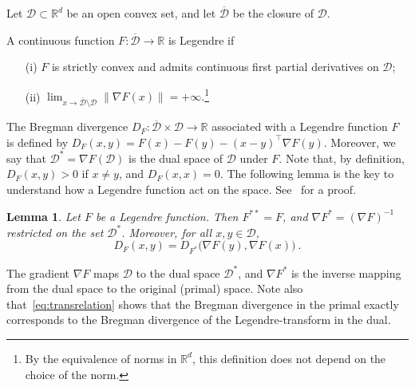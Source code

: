 \documentclass[11pt]{hackednow}
\newtheorem{lemma}{Lemma}[chapter]
\newcommand{\R}{\mathbb{R}}
\newcommand{\cD}{\mathcal{D}}
\newcommand{\oD}{\overline{\mathcal{D}}}
\newcommand{\norm}[1]{\left\|{#1}\right\|}
\begin{document}
Let $\cD \subset \R^d$ be an open convex set, and let $\oD$ be the closure of $\cD$. 
\begin{definition}
A continuous function $F:\oD\to\R$ is Legendre if 
\begin{itemize}
\item[(i)] $F$ is strictly convex and admits continuous first partial
derivatives on $\cD$;
\item[(ii)] ${\displaystyle \lim_{x \to \oD \setminus \cD} \norm{\nabla F(x)} = +\infty.}$\footnote{By the equivalence of norms in $\R^d$, this definition does not depend on the choice of the norm.}
\end{itemize}
\end{definition}
The Bregman divergence $D_F: \oD\times\cD \to \R$ associated with a Legendre function $F$ is defined by
  $
  D_F(x,y) = F(x) - F(y) - (x-y)^{\top} \nabla F(y)
  $. 
Moreover, we say that $\cD^* = \nabla F (\cD)$ is the dual space of $\cD$ under $F$.
Note that, by definition, $D_F(x,y) > 0$ if $x \neq y$, and $D_F(x,x)=0$. The following lemma is the key to understand how a Legendre function act on the space. See~\cite[Proposition~11.1]{CL06} for a proof.
\begin{lemma}
Let $F$ be a Legendre function. Then $F^{**} = F$, and $\nabla F^* = (\nabla F)^{-1}$ restricted on the set $\cD^*$. Moreover, for all $x, y \in \cD$,
\begin{equation} \label{eq:transrelation}
D_F(x,y) = D_{F^*}\bigl(\nabla F(y), \nabla F(x)\bigr)~.
\end{equation}
\end{lemma}
The gradient $\nabla F$ maps $\cD$ to the dual space $\cD^*$, and $\nabla F^*$ is the inverse mapping from the dual space to the original (primal) space. Note also that~\eqref{eq:transrelation} shows that the Bregman divergence in the primal exactly corresponds to the Bregman divergence of the Legendre-transform in the dual.
\end{document}
